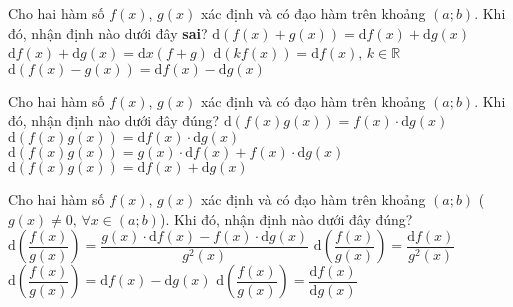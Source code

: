 \begin{ex}%
	Cho hai hàm số $f(x)$, $g(x)$ xác định và có đạo hàm trên khoảng $(a;b)$. Khi đó, nhận định nào dưới đây {\bf sai}?
	\choice
	{$\mathrm{d}\left(f(x)+g(x)\right)=\mathrm{d}f(x)+\mathrm{d}g(x)$}
	{\True $\mathrm{d}f(x)+\mathrm{d}g(x)=\mathrm{d}x\left(f+g\right)$}
	{$\mathrm{d}\left(kf(x)\right)=\mathrm{d}f(x),\, k\in\mathbb{R}$}
	{$\mathrm{d}\left(f(x)-g(x)\right)=\mathrm{d}f(x)-\mathrm{d}g(x)$}
\end{ex}

\begin{ex}%
	Cho hai hàm số $f(x)$, $g(x)$ xác định và có đạo hàm trên khoảng $(a;b)$. Khi đó, nhận định nào dưới đây đúng?
	\choice
	{$\mathrm{d}\left(f(x)g(x)\right)=f(x)\cdot\mathrm{d}g(x)$}
	{$\mathrm{d}\left(f(x)g(x)\right)=\mathrm{d}f(x)\cdot\mathrm{d}g(x)$}
	{\True $\mathrm{d}\left(f(x)g(x)\right)=g(x)\cdot\mathrm{d}f(x)+f(x)\cdot\mathrm{d}g(x)$}
	{$\mathrm{d}\left(f(x)g(x)\right)=\mathrm{d}f(x)+\mathrm{d}g(x)$}
\end{ex}

\begin{ex}%
	Cho hai hàm số $f(x)$, $g(x)$ xác định và có đạo hàm trên khoảng $(a;b)$ ($g(x)\ne 0,\,\forall x\in(a;b)$). Khi đó, nhận định nào dưới đây đúng?
	\choice
	{\True $\mathrm{d}\left(\dfrac{f(x)}{g(x)}\right)=\dfrac{g(x)\cdot\mathrm{d}f(x)-f(x)\cdot\mathrm{d}g(x)}{g^2(x)}$}
	{$\mathrm{d}\left(\dfrac{f(x)}{g(x)}\right)=\dfrac{\mathrm{d}f(x)}{g^2(x)}$}
	{$\mathrm{d}\left(\dfrac{f(x)}{g(x)}\right)=\mathrm{d}f(x)-\mathrm{d}g(x)$}
	{$\mathrm{d}\left(\dfrac{f(x)}{g(x)}\right)=\dfrac{\mathrm{d}f(x)}{\mathrm{d}g(x)}$}
\end{ex}

